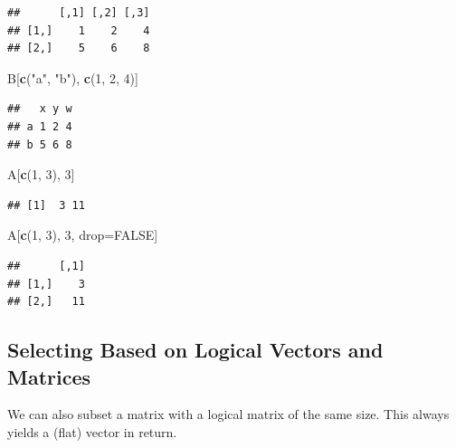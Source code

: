\documentclass[10pt,b5paper,krantz1]{krantz}
\newenvironment{Shaded}{\begin{snugshade}}{\end{snugshade}}
\newcommand{\DecValTok}[1]{\textcolor[rgb]{0.06,0.06,0.06}{#1}}
\newcommand{\KeywordTok}[1]{\textcolor[rgb]{0.27,0.27,0.27}{\textbf{#1}}}
\newcommand{\NormalTok}[1]{#1}
\newcommand{\OtherTok}[1]{\textcolor[rgb]{0.37,0.37,0.37}{#1}}
\newcommand{\StringTok}[1]{\textcolor[rgb]{0.5,0.5,0.5}{#1}}
\begin{document}
\begin{verbatim}
##      [,1] [,2] [,3]
## [1,]    1    2    4
## [2,]    5    6    8
\end{verbatim}

\begin{Shaded}
\begin{Highlighting}[]
\NormalTok{B[}\KeywordTok{c}\NormalTok{(}\StringTok{"a"}\NormalTok{, }\StringTok{"b"}\NormalTok{), }\KeywordTok{c}\NormalTok{(}\DecValTok{1}\NormalTok{, }\DecValTok{2}\NormalTok{, }\DecValTok{4}\NormalTok{)]}
\end{Highlighting}
\end{Shaded}

\begin{verbatim}
##   x y w
## a 1 2 4
## b 5 6 8
\end{verbatim}

\begin{Shaded}
\begin{Highlighting}[]
\NormalTok{A[}\KeywordTok{c}\NormalTok{(}\DecValTok{1}\NormalTok{, }\DecValTok{3}\NormalTok{), }\DecValTok{3}\NormalTok{]}
\end{Highlighting}
\end{Shaded}

\begin{verbatim}
## [1]  3 11
\end{verbatim}

\begin{Shaded}
\begin{Highlighting}[]
\NormalTok{A[}\KeywordTok{c}\NormalTok{(}\DecValTok{1}\NormalTok{, }\DecValTok{3}\NormalTok{), }\DecValTok{3}\NormalTok{, drop=}\OtherTok{FALSE}\NormalTok{]}
\end{Highlighting}
\end{Shaded}

\begin{verbatim}
##      [,1]
## [1,]    3
## [2,]   11
\end{verbatim}

\hypertarget{selecting-based-on-logical-vectors-and-matrices}{%
\subsection{Selecting Based on Logical Vectors and Matrices}\label{selecting-based-on-logical-vectors-and-matrices}}

We can also subset a matrix with a logical matrix of the same size.
This always yields a (flat) vector in return.
\end{document}
